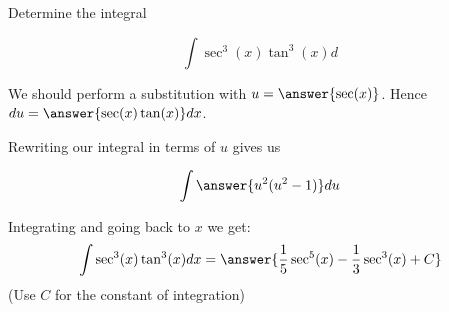 \documentclass{ximera}
\author{Jason Miller}
\begin{document}
\begin{exercise}
Determine the integral

\[
\int \sec^{3}(x) \tan^{3}(x) d
\]

We should perform a substitution with $u=\answer{ \sec(x)}$. Hence $du= \answer{ \sec(x)\tan(x)} dx$. 

\begin{exercise}
Rewriting our integral in terms of $u$ gives us 

\[
\int \answer{u^{2} (u^{2}-1)} du
\]
\begin{exercise}
Integrating and going back to $x$ we get:
\[
\int \sec^{3}(x) \tan^{3}(x) dx= \answer{\frac{1}{5}\sec^5(x) -\frac{ 1}{3} \sec^3(x)+C}
\]
(Use $C$ for the constant of integration)
\end{exercise}
\end{exercise}
\end{exercise}
\end{document}
